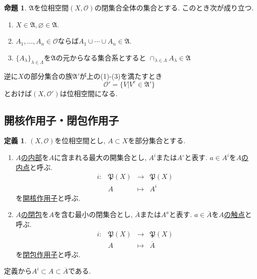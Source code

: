 \documentclass[dvipdfmx,a4paper,11pt]{article}
\theoremstyle{definition}
\newtheorem{prop}[thm]{命題}
\newtheorem{dfn}[thm]{定義}
\begin{document}
\begin{tcolorbox}[
    colback = white,
    colframe = green!35!black,
    fonttitle = \bfseries,
    breakable = true]
    \begin{prop}
    \text{}
$\mathfrak{A}$を位相空間$(X, \mathscr{O} )$の閉集合全体の集合とする. このとき次が成り立つ.
    \begin{enumerate}
     \setlength{\parskip}{0cm} 
  \setlength{\itemsep}{0cm} 
    \item $X \in \mathfrak{A}, \varnothing \in \mathfrak{A}$.
    \item $A_1, \ldots, A_n \in \mathscr{O}$ならば$A_1 \cup \cdots \cup A_n \in \mathfrak{A}$.
    \item $\{ A_{\lambda} \}_{\lambda \in \Lambda}$を$\mathfrak{A}$の元からなる集合系とすると
    $\cap_{ \lambda \in \Lambda  }A_{\lambda} \in \mathfrak{A}$
    \end{enumerate}
逆に$X$の部分集合の族$\mathfrak{A}'$が上の(1)-(3)を満たすとき
 $$
 \mathscr{O}' = \{ V | V^c \in \mathfrak{A}'\}
 $$
 とおけば$(X, \mathscr{O}')$は位相空間になる.
  \end{prop}
 \end{tcolorbox}
 
\subsection{開核作用子・閉包作用子}
\begin{tcolorbox}[
    colback = white,
    colframe = green!35!black,
    fonttitle = \bfseries,
    breakable = true]
    \begin{dfn}
$(X, \mathscr{O} )$を位相空間とし, $A \subset X$を部分集合とする.
\begin{enumerate}
\item \underline{$A$の内部}を$A$に含まれる最大の開集合とし, $A^i$または$A^{\circ}$と表す. $a \in A^i$を\underline{$A$の内点}と呼ぶ.
    $$
\begin{array}{cccc}
i: &\mathfrak{P}(X)& \rightarrow & \mathfrak{P}(X)  \\
&A& \longmapsto & A^i
\end{array}
$$
を\underline{開核作用子}と呼ぶ.
\item \underline{$A$の閉包}を$A$を含む最小の閉集合とし, $\overline{A}$または$A^{a}$と表す. $a \in \overline{A}$を\underline{$A$の触点}と呼ぶ.
    $$
\begin{array}{cccc}
i: &\mathfrak{P}(X)& \rightarrow & \mathfrak{P}(X)  \\
&A& \longmapsto & \overline{A}
\end{array}
$$
を\underline{閉包作用子}と呼ぶ.
\end{enumerate}

  \end{dfn}
 \end{tcolorbox}
 定義から$A^i \subset A \subset \overline{A}$である.
 
\end{document}
